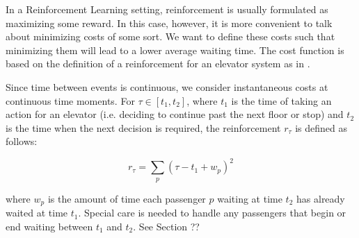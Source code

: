 In a Reinforcement Learning setting, reinforcement is usually formulated as maximizing some reward. In this case, however, it is more convenient to talk about minimizing costs of some sort. We want to define these costs such that minimizing them will lead to a lower average waiting time. The cost function is based on the definition of a reinforcement for an elevator system as in \cite{crites_barto_group_1998, crites_barto_1998}.

Since time between events is continuous, we consider instantaneous costs at continuous time moments. For $\tau \in [t_1, t_2]$, where $t_1$ is the time of taking an action for an elevator (i.e. deciding to continue past the next floor or stop) and $t_2$ is the time when the next decision is required, the reinforcement $r_\tau$ is defined as follows:

\begin{equation}
    r_\tau = \sum_p (\tau - t_1 + w_p)^2
\end{equation}

where $w_p$ is the amount of time each passenger $p$ waiting at time $t_2$ has already waited at
time $t_1$. Special care is needed to handle any passengers that begin or end waiting between
$t_1$ and $t_2$. {\color{red} See Section ??}

